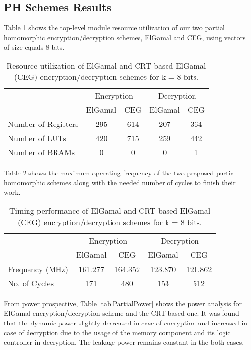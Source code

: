 \documentclass[conference]{IEEEtran}
\begin{document}
\subsection{PH Schemes Results}
Table \ref{tab:PartialRes} shows the top-level module resource utilization of our two partial homomorphic encryption/decryption schemes, ElGamal and CEG, using vectors of size equals 8 bits. 

\begin{table}[b]
  \centering
  \caption{Resource utilization of ElGamal and CRT-based ElGamal (CEG) encryption/decryption schemes for k = 8 bits.}
    \tabcolsep=0.11cm 
\begin{tabular}{|l||c|c||c|c|}
    \toprule
    & \multicolumn{2}{c}{Encryption }  & \multicolumn{2}{c}{Decryption} \vline\\
    & ElGamal  & CEG   & ElGamal  & CEG   \\
    \midrule
    Number of Registers & 295   & 614   & 207   & 364   \\
    Number of LUTs      & 420   & 715   & 259   & 442   \\
    Number of BRAMs     & 0     & 0     & 0     & 1     \\
    \bottomrule
    \end{tabular}\label{tab:PartialRes}\end{table}


Table \ref{tab:PartialTiming} shows the maximum operating frequency of the two proposed partial homomorphic schemes along with the needed number of cycles to finish their work. 

\begin{table}[b]
  \centering
  \caption{Timing performance of ElGamal and CRT-based ElGamal (CEG) encryption/decryption schemes for k = 8 bits.}
    \tabcolsep=0.11cm 
\begin{tabular}{|l||c|c||c|c|}
    \toprule
                  & \multicolumn{2}{c}{Encryption } & \multicolumn{2}{c}{Decryption} \vline\\
                  & ElGamal & CEG     & ElGamal & CEG \\
    \midrule
    Frequency (MHz)& 161.277 & 164.352 & 123.870 & 121.862 \\
    No. of Cycles & 171   & 480   & 153   & 512 \\
\bottomrule 
    \end{tabular}\label{tab:PartialTiming}\end{table}
From power prospective, Table \ref{tab:PartialPower} shows the power analysis for ElGamal encryption/decryption scheme and the CRT-based one. It was found that the dynamic power slightly decreased in case of encryption and increased in case of decryption due to the usage of the memory component and its logic controller in decryption. The leakage power remains constant in the both cases.
\end{document}
